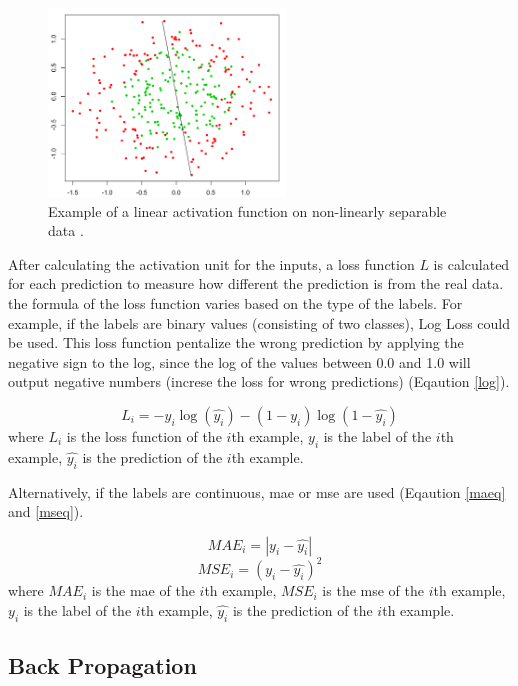 \documentclass[runningheads]{llncs}
\begin{document}
\begin{figure}[H]
    \label{nls}
    \centering
    \includegraphics[height=5cm]{linear}
    \caption{Example of a linear activation function on non-linearly separable data \cite{nonsep}. }
\end{figure}

After calculating the activation unit for the inputs, 
a loss function $L$ is calculated for each prediction to measure 
how different the prediction is from the real data. the formula of the loss function varies based on the type of the labels.
For example, if the labels are binary values (consisting of two classes), 
Log Loss could be used. 
This loss function pentalize the wrong prediction by applying the negative sign 
to the log, since the log of the values between 0.0 and 1.0 will output negative numbers
(increse the loss for wrong predictions) (Eqaution \ref{log}). 

\begin{equation}
    \label{log}
L_{i} = -y_{i} \log{(\hat{y_{i}})} - (1 - y_{i})\log{(1-\hat{y_{i}})}
\end{equation}
where $L_{i}$ is the loss function of the $i$th example, $y_{i}$ is the label of the $i$th example,
$\hat{y_{i}}$ is the prediction of the $i$th example.


Alternatively, if the labels are continuous, 
\gls{mae} or \gls{mse} are used (Eqaution \ref{maeq} and \ref{mseq}).

\begin{equation}
    \label{maeq}
    MAE_{i} = |y_{i} - \hat{y_{i}}|
\end{equation}
\begin{equation}
    \label{mseq}
    MSE_{i} = {(y_{i} - \hat{y_{i}})}^2
\end{equation}
where $MAE_{i}$ is the \gls{mae} of the $i$th example, $MSE_{i}$ is the \gls{mse} of the $i$th example,  
$y_{i}$ is the label of the $i$th example,
$\hat{y_{i}}$ is the prediction of the $i$th example.


\subsection{Back Propagation}
\end{document}
